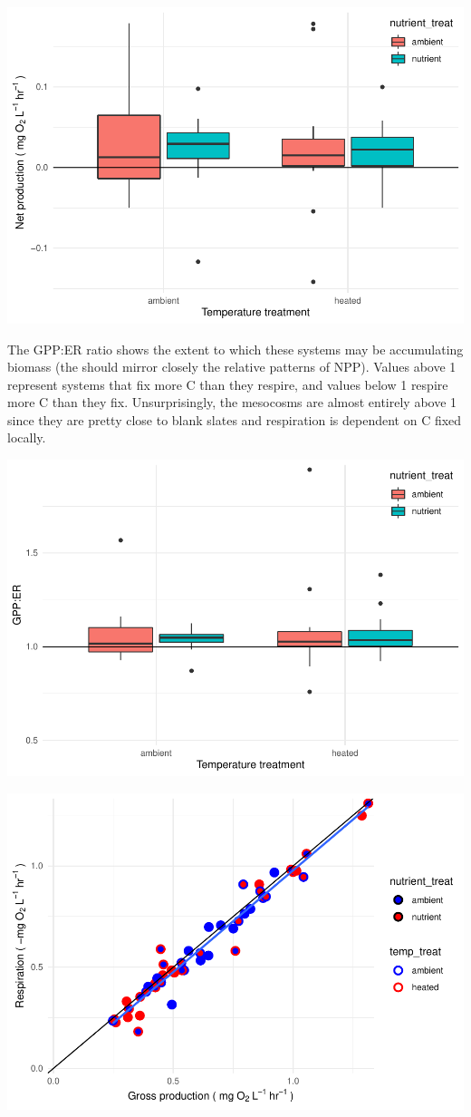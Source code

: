 \documentclass[
]{article}
\begin{document}
\includegraphics{GPP-report_files/figure-latex/np boxplots-1.pdf}

The GPP:ER ratio shows the extent to which these systems may be
accumulating biomass (the should mirror closely the relative patterns of
NPP). Values above 1 represent systems that fix more C than they
respire, and values below 1 respire more C than they fix.
Unsurprisingly, the mesocosms are almost entirely above 1 since they are
pretty close to blank slates and respiration is dependent on C fixed
locally.

\includegraphics{GPP-report_files/figure-latex/NEP estimates-1.pdf}

\includegraphics{GPP-report_files/figure-latex/GPP-ER scatter-1.pdf}
\end{document}

